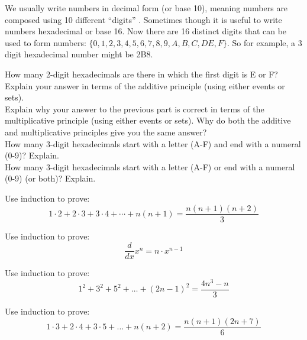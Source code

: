\begin{exercise} 
We usually write numbers in decimal form (or base 10), meaning numbers are composed using 10 different “digits” . Sometimes though it is useful to write numbers hexadecimal or base 16. Now there are 16 distinct digits that can be used to form numbers: \break $\{0,1,2,3,4,5,6,7,8,9,A,B,C,DE,F\}$. So for example, a 3 digit hexadecimal number might be 2B8.

How many 2-digit hexadecimals are there in which the first digit is E or F? Explain your answer in terms of the additive principle (using either events or sets).\\
Explain why your answer to the previous part is correct in terms of the multiplicative principle (using either events or sets). Why do both the additive and multiplicative principles give you the same answer?\\
How many 3-digit hexadecimals start with a letter (A-F) and end with a numeral (0-9)? Explain.\\
How many 3-digit hexadecimals start with a letter (A-F) or end with a numeral (0-9) (or both)? Explain.

\end{exercise}



\begin{proofp}
Use induction to prove: $${1\cdot2}+{2\cdot3}+{3\cdot4}+\cdots+{n(n+1)}=\frac{n(n+1)(n+2)}{3}$$
\end{proofp}

\begin{proofp}
Use induction to prove: $$\frac{d}{dx}x^n=n\cdot x^{n-1}$$
\end{proofp}


\begin{proofp}
Use induction to prove: $$1^2+3^2+5^2 + \ldots +(2n-1)^2=\frac{4n^3-n}{3}$$
\end{proofp}

\begin{proofp}
Use induction to prove: $$1\cdot3+2\cdot4+3\cdot5 + \ldots +n(n+2)=\frac{n(n+1)(2n+7)}{6}$$
\end{proofp}

